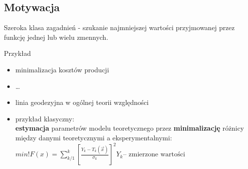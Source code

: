   \subsection{Motywacja}
    \begin{frame}
      \begin{block}{}
        Szeroka klasa zagadnień - szukanie najmniejszej wartości
        przyjmowanej przez funkcję jednej lub wielu zmennych.
      \end{block}

      \begin{exampleblock}{Przykład}
        \begin{itemize}
          \item minimalizacja kosztów producji
          \item \ldots
          \item linia geodezyjna w ogólnej teorii względności
          \item przykład klasyczny:\\
          \textbf{estymacja} parametrów modelu teoretycznego
          przez \textbf{minimalizację} różnicy między danymi
          teoretycznymi a eksperymentalnymi:\\
          $
            min!F(x) = \sum_{k/1}^{k} \left[ \frac{Y_k - T_k(\vec x)}{\sigma_k}
            \right] ^2 Y_k \text{-- zmierzone wartości}
          $

        \end{itemize}
      \end{exampleblock}
    \end{frame}
